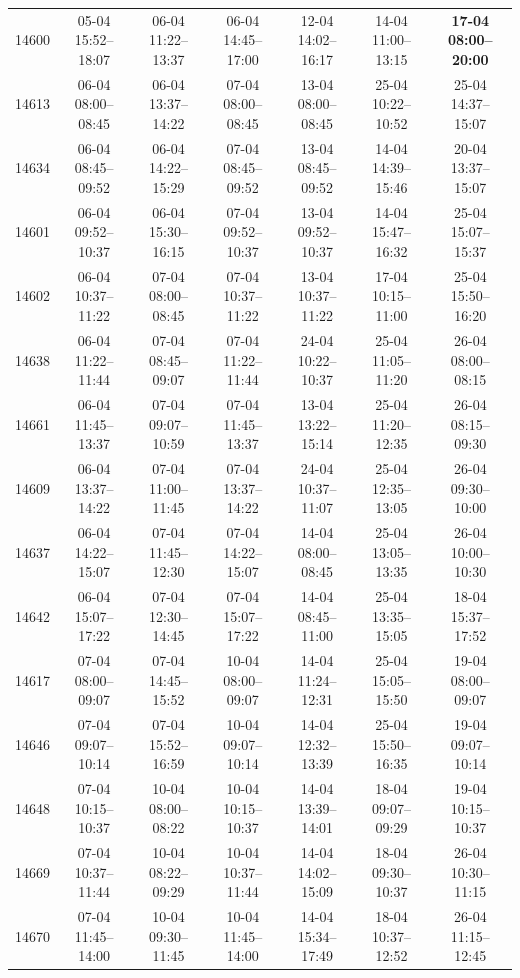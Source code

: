 \begin{table}[htbp]
\begin{tabular}{|r|c|c|c|c|c|c|}
14600 & 05-04 15:52--18:07 & 06-04 11:22--13:37 & 06-04 14:45--17:00 & 12-04 14:02--16:17 & 14-04 11:00--13:15 & \textbf{17-04 08:00--20:00} \\ 
14613 & 06-04 08:00--08:45 & 06-04 13:37--14:22 & 07-04 08:00--08:45 & 13-04 08:00--08:45 & 25-04 10:22--10:52 & 25-04 14:37--15:07 \\ 
14634 & 06-04 08:45--09:52 & 06-04 14:22--15:29 & 07-04 08:45--09:52 & 13-04 08:45--09:52 & 14-04 14:39--15:46 & 20-04 13:37--15:07 \\ 
14601 & 06-04 09:52--10:37 & 06-04 15:30--16:15 & 07-04 09:52--10:37 & 13-04 09:52--10:37 & 14-04 15:47--16:32 & 25-04 15:07--15:37 \\ 
14602 & 06-04 10:37--11:22 & 07-04 08:00--08:45 & 07-04 10:37--11:22 & 13-04 10:37--11:22 & 17-04 10:15--11:00 & 25-04 15:50--16:20 \\ 
14638 & 06-04 11:22--11:44 & 07-04 08:45--09:07 & 07-04 11:22--11:44 & 24-04 10:22--10:37 & 25-04 11:05--11:20 & 26-04 08:00--08:15 \\ 
14661 & 06-04 11:45--13:37 & 07-04 09:07--10:59 & 07-04 11:45--13:37 & 13-04 13:22--15:14 & 25-04 11:20--12:35 & 26-04 08:15--09:30 \\ 
14609 & 06-04 13:37--14:22 & 07-04 11:00--11:45 & 07-04 13:37--14:22 & 24-04 10:37--11:07 & 25-04 12:35--13:05 & 26-04 09:30--10:00 \\ 
14637 & 06-04 14:22--15:07 & 07-04 11:45--12:30 & 07-04 14:22--15:07 & 14-04 08:00--08:45 & 25-04 13:05--13:35 & 26-04 10:00--10:30 \\ 
14642 & 06-04 15:07--17:22 & 07-04 12:30--14:45 & 07-04 15:07--17:22 & 14-04 08:45--11:00 & 25-04 13:35--15:05 & 18-04 15:37--17:52 \\ 
14617 & 07-04 08:00--09:07 & 07-04 14:45--15:52 & 10-04 08:00--09:07 & 14-04 11:24--12:31 & 25-04 15:05--15:50 & 19-04 08:00--09:07 \\ 
14646 & 07-04 09:07--10:14 & 07-04 15:52--16:59 & 10-04 09:07--10:14 & 14-04 12:32--13:39 & 25-04 15:50--16:35 & 19-04 09:07--10:14 \\ 
14648 & 07-04 10:15--10:37 & 10-04 08:00--08:22 & 10-04 10:15--10:37 & 14-04 13:39--14:01 & 18-04 09:07--09:29 & 19-04 10:15--10:37 \\ 
14669 & 07-04 10:37--11:44 & 10-04 08:22--09:29 & 10-04 10:37--11:44 & 14-04 14:02--15:09 & 18-04 09:30--10:37 & 26-04 10:30--11:15 \\ 
14670 & 07-04 11:45--14:00 & 10-04 09:30--11:45 & 10-04 11:45--14:00 & 14-04 15:34--17:49 & 18-04 10:37--12:52 & 26-04 11:15--12:45 \\ 

\end{tabular}
\end{table}
